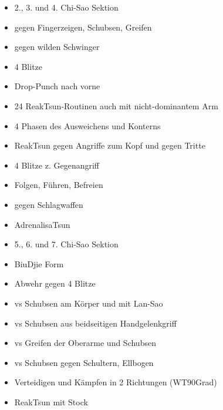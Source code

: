 \begin{WTGradTG}{1}

\begin{itemize}
	\item 2., 3. und 4. Chi-Sao Sektion
	\item gegen Fingerzeigen, Schubsen, Greifen
	\item gegen wilden Schwinger
	\item 4 Blitze
	\item Drop-Punch nach vorne
	\item 24 ReakTsun-Routinen auch mit nicht-dominantem Arm
	\item 4 Phasen des Ausweichens und Konterns
	\item ReakTsun gegen Angriffe zum Kopf und gegen Tritte
	\item 4 Blitze z. Gegenangriff
	\item Folgen, F\"uhren, Befreien
	\item gegen Schlagwaffen
	\item AdrenalisaTsun
\end{itemize}

\end{WTGradTG}

\begin{WTGradTG}{2}

\begin{itemize}
	\item 5., 6. und 7. Chi-Sao Sektion
	\item BiuDjie Form
	\item Abwehr gegen 4 Blitze
	\item vs Schubsen am K\"orper und mit Lan-Sao
	\item vs Schubsen aus beidseitigen Handgelenkgriff
	\item vs Greifen der Oberarme und Schubsen
	\item vs Schubsen gegen Schultern, Ellbogen
	\item Verteidigen und K\"ampfen in 2 Richtungen (WT90Grad)
	\item ReakTsun mit Stock
\end{itemize}
	
\end{WTGradTG}

